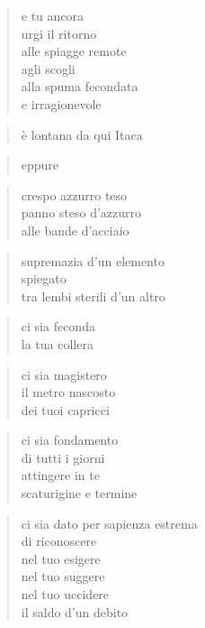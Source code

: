 	\begin{verse}
		e tu ancora\\
		urgi il ritorno\\
		alle spiagge remote\\
		agli scogli\\
		alla spuma fecondata\\
		e irragionevole
	\end{verse}

	\begin{verse}
		è lontana da qui Itaca
	\end{verse}

	\begin{verse}
		eppure
	\end{verse}

\clearpage


\vspace*{2cm}

	\begin{verse}
		crespo azzurro teso\\
		panno steso d’azzurro\\
		alle bande d’acciaio
	\end{verse}

	\begin{verse}
		supremazia d’un elemento\\
		spiegato\\
		tra lembi sterili d’un altro
	\end{verse}

	\begin{verse}
		ci sia feconda\\
		la tua collera
	\end{verse}

	\begin{verse}
		ci sia magistero\\
		il metro nascosto\\
		dei tuoi capricci
	\end{verse}

	\begin{verse}
		ci sia fondamento\\
		di tutti i giorni\\
		attingere in te\\
		scaturigine e termine
	\end{verse}

	\begin{verse}
		ci sia dato
		per sapienza estrema\\
		di riconoscere\\
		nel tuo esigere\\
		nel tuo suggere\\
		nel tuo uccidere\\
		il saldo d’un debito
	\end{verse}

